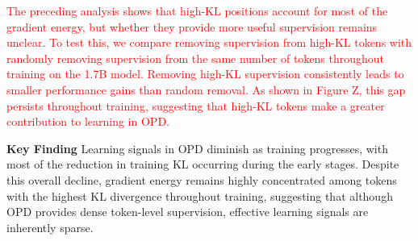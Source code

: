 \textcolor{red}{
The preceding analysis shows that high-KL positions account for most of the gradient energy, but whether they provide more useful supervision remains unclear. To test this, we compare removing supervision from high-KL tokens with randomly removing supervision from the same number of tokens throughout training on the 1.7B model. Removing high-KL supervision consistently leads to smaller performance gains than random removal. As shown in Figure Z, this gap persists throughout training, suggesting that high-KL tokens make a greater contribution to learning in OPD.
}

\begin{tcolorbox}
\textbf{\textcolor{findingblue}{Key Finding}} Learning signals in OPD diminish as training progresses, with most of the reduction in training KL occurring during the early stages. Despite this overall decline, gradient energy remains highly concentrated among tokens with the highest KL divergence throughout training, suggesting that although OPD provides dense token-level supervision, effective learning signals are inherently sparse.
\end{tcolorbox}

